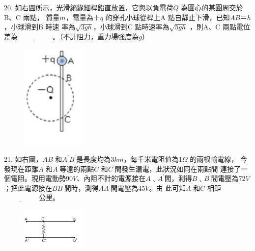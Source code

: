 \documentclass[cn,10pt,math=newtx]{elegantbook}
\begin{document}
\begin{example}
   20. 如右圖所示，光滑絕緣細桿鉛直放置，它與以負電荷$Q$ 為圓心的某圓周交於B、C 兩點，
質量$m$，電量為$＋q$ 的穿孔小球從桿上A 點自靜止下滑，已知$AB＝h$，小球滑到B 時速
率為$\sqrt{3gh}$，小球滑到C 點時速率為$\sqrt{5gh}$ ，則A、C 兩點電位差為$\underline{\hspace{2cm}}$ 。（不計阻力，重力場強度為$g$）\\
    \rightline{[中壢高中教甄109]}
\end{example}
\begin{solution}
    
\end{solution}
\begin{figure}[htbp]
    \flushright
    \includegraphics[width=0.3\textwidth]{image/109中壢20.png}
  \end{figure}
\newpage

\begin{example}
   21. 如右圖，$AB$ 和$A^{'}  B^{'}$是長度均為3$km$，每千米電阻值為1$\Omega$ 的兩根輸電線，
今發現在距離$A$ 和$A^{’}$等遠的兩點$C$ 和$C^{’}$間發生漏電，此狀況如同在兩點間
連接了一個電阻。現用電動勢90$V$、內阻不計的電源接在$A﹑A^{’}$間，測得$B﹑
B^{’}$間電壓為72$V$；把此電源接在$B  B^{’}$間時，測得$A  A^{’}$間電壓為45$V$。由
此可知$A$ 和$C$ 相距$\underline{\hspace{2cm}}$ 公里。\\
    \rightline{[中壢高中教甄109]}
\end{example}
\begin{solution}
    
\end{solution}
\begin{figure}[htbp]
    \flushright
    \includegraphics[width=0.3\textwidth]{image/109中壢21.png}
  \end{figure}
\newpage
\end{document}
